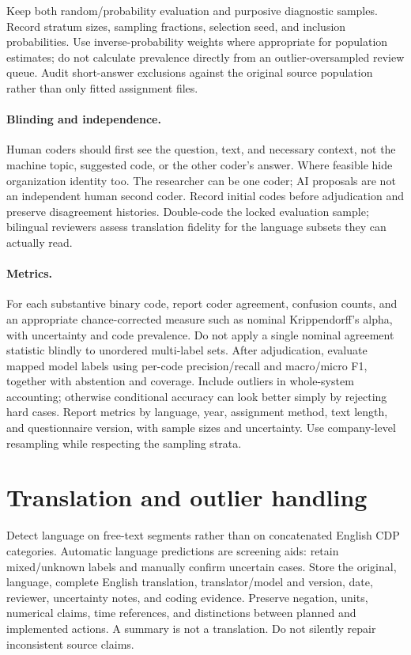 \documentclass[11pt,a4paper]{article}
\begin{document}
Keep both random/probability evaluation and purposive diagnostic samples.
Record stratum sizes, sampling fractions, selection seed, and inclusion
probabilities. Use inverse-probability weights where appropriate for
population estimates; do not calculate prevalence directly from an
outlier-oversampled review queue. Audit short-answer exclusions against
the original source population rather than only fitted assignment files.

\paragraph{Blinding and independence.}
Human coders should first see the question, text, and necessary context,
not the machine topic, suggested code, or the other coder's answer. Where
feasible hide organization identity too. The researcher can be one coder;
AI proposals are not an independent human second coder. Record initial
codes before adjudication and preserve disagreement histories. Double-code
the locked evaluation sample; bilingual reviewers assess translation
fidelity for the language subsets they can actually read.

\paragraph{Metrics.}
For each substantive binary code, report coder agreement, confusion counts,
and an appropriate chance-corrected measure such as nominal Krippendorff's
alpha, with uncertainty and code prevalence. Do not apply a single nominal
agreement statistic blindly to unordered multi-label sets. After
adjudication, evaluate mapped model labels using per-code precision/recall
and macro/micro F1, together with abstention and coverage.
Include outliers in whole-system accounting; otherwise conditional accuracy
can look better simply by rejecting hard cases. Report metrics by language,
year, assignment method, text length, and questionnaire version, with
sample sizes and uncertainty. Use company-level resampling while respecting
the sampling strata.

\section{Translation and outlier handling}
Detect language on free-text segments rather than on concatenated English
CDP categories. Automatic language predictions are screening aids: retain
mixed/unknown labels and manually confirm uncertain cases.
Store the original, language, complete English translation, translator/model
and version, date, reviewer, uncertainty notes, and coding evidence.
Preserve negation, units, numerical claims, time references, and distinctions
between planned and implemented actions. A summary is not a translation.
Do not silently repair inconsistent source claims.
\end{document}
